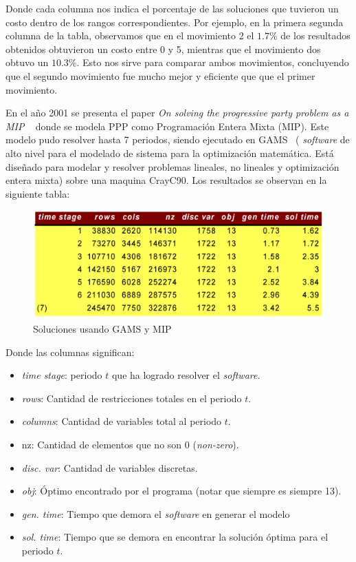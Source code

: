 \documentclass[letter, 10pt]{article}
\begin{document}
Donde cada columna nos indica el porcentaje de las soluciones que tuvieron un costo dentro de los rangos correspondientes. Por ejemplo, en la primera segunda columna de la tabla, observamos que en el movimiento 2 el $1.7\%$ de los resultados obtenidos obtuvieron un costo entre 0 y 5, mientras que el movimiento dos obtuvo un $10.3\%$. Esto nos sirve para comparar ambos movimientos, concluyendo que el segundo movimiento fue mucho mejor y eficiente que que el primer movimiento.

En el año 2001 se presenta el paper \textit{On solving the progressive party problem as a MIP} ~\cite{Kalvelagen20031713} donde se modela PPP como Programación Entera Mixta (MIP). Este modelo pudo resolver hasta 7 periodos, siendo ejecutado en GAMS~\cite{Brook:1988:GUG:58859.58863} ( \textit{software} de alto nivel para el modelado de sistema para la optimización matemática. Está diseñado para modelar y resolver problemas lineales, no lineales y optimización entera mixta) sobre una maquina CrayC90. Los resultados se observan en la siguiente tabla:

\begin{figure}[ht!]
\centering
 \includegraphics[width=1.0\textwidth]{party6.png}
 \caption{Soluciones usando GAMS y MIP}
\end{figure}

\newpage
Donde las columnas significan:
\begin{itemize}
    \item \textit{time stage}: periodo $t$ que ha logrado resolver el \textit{software}.
    \item \textit{rows}: Cantidad de restricciones totales en el periodo $t$.
    \item \textit{columns}: Cantidad de variables total al periodo $t$.
    \item nz: Cantidad de elementos que no son 0 (\textit{non-zero}).
    \item \textit{disc. var}: Cantidad de variables discretas.
    \item \textit{obj}: Óptimo encontrado por el programa (notar que siempre es siempre 13).
    \item \textit{gen. time}: Tiempo que demora el \textit{software} en generar el modelo
    \item \textit{sol. time}: Tiempo que se demora en encontrar la solución óptima para el periodo $t$.
\end{itemize}
\end{document}
